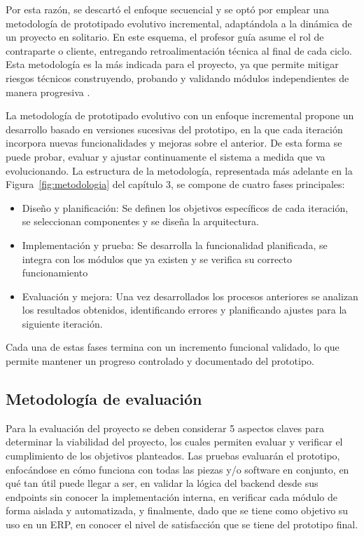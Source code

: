 \documentclass{iccmemoria}
\begin{document}
Por esta razón, se descartó el enfoque secuencial y se optó por emplear una metodología de prototipado evolutivo incremental, adaptándola a la dinámica de un proyecto en solitario. En este esquema, el profesor guía asume el rol de contraparte o cliente, entregando retroalimentación técnica al final de cada ciclo. Esta metodología es la más indicada para el proyecto, ya que permite mitigar riesgos técnicos construyendo, probando y validando módulos independientes de manera progresiva \cite{teachict_prototipado} \cite{geeksforgeeks_incremental}.

La metodología de prototipado evolutivo con un enfoque incremental propone un desarrollo basado en versiones sucesivas del prototipo, en la que cada iteración incorpora nuevas funcionalidades y mejoras sobre el anterior. De esta forma se puede probar, evaluar y ajustar continuamente el sistema a medida que va evolucionando. La estructura de la metodología, representada más adelante en la Figura~\ref{fig:metodologia} del capítulo 3, se compone de cuatro fases principales:
\begin{itemize}
    \item Diseño y planificación: Se definen los objetivos específicos de cada iteración, se seleccionan componentes y se diseña la arquitectura.
    \item Implementación y prueba: Se desarrolla la funcionalidad planificada, se integra con los módulos que ya existen y se verifica su correcto funcionamiento
    \item Evaluación y mejora: Una vez desarrollados los procesos anteriores se analizan los resultados obtenidos, identificando errores y planificando ajustes para la siguiente iteración.
\end{itemize} \cite{pressman2021} 

Cada una de estas fases termina con un incremento funcional validado, lo que permite mantener un progreso controlado y documentado del prototipo.

\subsection{Metodología de evaluación}
Para la evaluación del proyecto se deben considerar 5 aspectos claves
para determinar la viabilidad del proyecto, los cuales permiten evaluar y verificar el cumplimiento de los objetivos planteados.
Las pruebas evaluarán el prototipo, enfocándose en cómo funciona con todas las piezas y/o software en conjunto, en qué tan útil puede llegar a ser, en validar la lógica del backend desde sus endpoints sin conocer la implementación interna, en verificar cada módulo de forma aislada y automatizada, y finalmente, dado que se tiene como objetivo su uso en un ERP, en conocer el nivel de satisfacción que se tiene del prototipo final.
\end{document}
